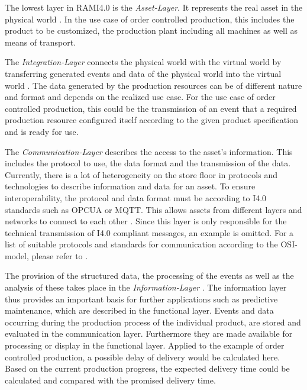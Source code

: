 The lowest layer in \ac{RAMI4.0} is the \textit{Asset-Layer}. It represents the real asset in the physical world \cite[p. 46]{Heidel2017ReferenzarchitekturmodellIndustrie4.0Komponente}. In the use case of order controlled production, this includes the product to be customized, the production plant including all machines as well as means of transport. 
    
The \textit{Integration-Layer} connects the physical world with the virtual world by transferring generated events and data of the physical world into the virtual world \cite[p. 46]{Heidel2017ReferenzarchitekturmodellIndustrie4.0Komponente}. The data generated by the production resources can be of different nature and format and depends on the realized use case. For the use case of order controlled production, this could be the transmission of an event that a required production resource configured itself according to the given product specification and is ready for use.  
    
The \textit{Communication-Layer} describes the access to the asset's information. This includes the protocol to use, the data format and the transmission of the data. Currently, there is a lot of heterogeneity on the store floor in protocols and technologies to describe information and data for an asset. To ensure interoperability, the protocol and data format must be according to \ac{I4.0} standards such as \ac{OPCUA} or \ac{MQTT}. This allows assets from different layers and networks to connect to each other \cite[p. 47]{Heidel2017ReferenzarchitekturmodellIndustrie4.0Komponente}. Since this layer is only responsible for the technical transmission of \ac{I4.0} compliant messages, an example is omitted. For a list of suitable protocols and standards for communication according to the OSI-model, please refer to \citet[p. 49]{Heidel2017ReferenzarchitekturmodellIndustrie4.0Komponente}.  
    
The provision of the structured data, the processing of the events as well as the analysis of these takes place in the \textit{Information-Layer} \cite[p. 51]{Heidel2017ReferenzarchitekturmodellIndustrie4.0Komponente}. The information layer thus provides an important basis for further applications such as predictive maintenance, which are described in the functional layer. Events and data occurring during the production process of the individual product,  are stored and evaluated in the communication layer. Furthermore they are made available for processing or display in the functional layer. Applied to the example of order controlled production, a possible delay of delivery would be calculated here. Based on the current production progress, the expected delivery time could be calculated and compared with the promised delivery time.
    
